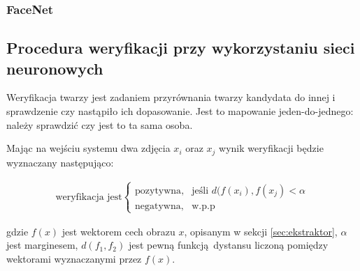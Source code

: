 \subsubsection{FaceNet}\label{sec:tripletloss}


\subsection{Procedura weryfikacji przy wykorzystaniu sieci neuronowych}\label{sec:verify_process}

Weryfikacja twarzy jest zadaniem przyrównania twarzy kandydata 
do innej i sprawdzenie czy nastąpiło ich dopasowanie. Jest to mapowanie
jeden-do-jednego: należy sprawdzić czy jest to ta sama osoba.

Mając na wejściu systemu dwa zdjęcia \(x_i\) oraz \(x_j\) wynik weryfikacji będzie wyznaczany następująco:

\begin{align}\label{eq:ekstraktor_weryfikacja}
\text{weryfikacja jest}\begin{cases}
    \text{pozytywna},& \text{jeśli } d(f(x_i), f(x_j) < \alpha \\
    \text{negatywna},              & \text{w.p.p}
\end{cases}
\end{align}

gdzie \(f(x)\) jest wektorem cech obrazu \(x\), opisanym w sekcji
\ref{sec:ekstraktor}, \(\alpha\) jest marginesem, \(d(f_1, f_2)\) jest pewną funkcją dystansu liczoną pomiędzy wektorami wyznaczanymi przez \(f(x)\).
